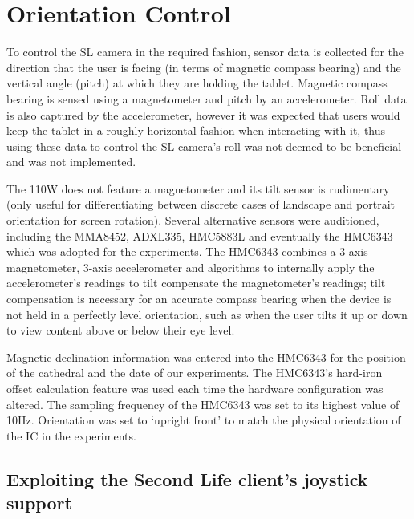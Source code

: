 
\section{Orientation Control}

To control the SL camera in the required fashion, sensor data is collected for the direction that the user is facing (in terms of magnetic compass bearing) and the vertical angle (pitch) at which they are holding the tablet. Magnetic compass bearing is sensed using a magnetometer and pitch by an accelerometer. Roll data is also captured by the accelerometer, however it was expected that users would keep the tablet in a roughly horizontal fashion when interacting with it, thus using these data to control the SL camera's roll was not deemed to be beneficial and was not implemented.

The 110W does not feature a magnetometer and its tilt sensor is rudimentary (only useful for differentiating between discrete cases of landscape and portrait orientation for screen rotation). Several alternative sensors were auditioned, including the MMA8452, ADXL335, HMC5883L and eventually the HMC6343 which was adopted for the experiments. The HMC6343 combines a 3-axis magnetometer, 3-axis accelerometer and algorithms to internally apply the accelerometer's readings to tilt compensate the magnetometer's readings; tilt compensation is necessary for an accurate compass bearing when the device is not held in a perfectly level orientation, such as when the user tilts it up or down to view content above or below their eye level.

Magnetic declination information was entered into the HMC6343 for the position of the cathedral and the date of our experiments. The HMC6343's hard-iron offset calculation feature was used each time the hardware configuration was altered. The sampling frequency of the HMC6343 was set to its highest value of 10Hz. Orientation was set to `upright front' to match the physical orientation of the IC in the experiments.


\subsection{Exploiting the Second Life client's joystick support}

